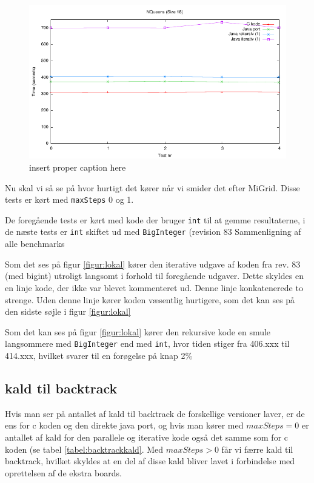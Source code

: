 \begin{figure}[h]
\begin{center}
\includegraphics{../benchmarks/b1.pdf}
\caption{insert proper caption here } 
\label{figur:b1}
\end{center}
\end{figure}

Nu skal vi så se på hvor hurtigt det kører når vi smider det efter MiGrid. 
Disse tests er kørt med \texttt{maxSteps} 0 og 1.

De foregående tests er kørt med kode der bruger \texttt{int} til at gemme resultaterne,
i de næste tests er \texttt{int} skiftet ud med \texttt{BigInteger} (revision
83
\clearpage
Sammenligning af alle benchmarks

Som det ses på figur \ref{figur:lokal} kører den iterative udgave af koden fra
rev. 83 (med bigint) utroligt langsomt i forhold til foregående udgaver.  Dette
skyldes en en linje kode, der ikke var blevet kommenteret ud. Denne linje
konkatenerede to strenge. Uden denne linje kører koden væsentlig hurtigere, som
det kan ses på den sidste søjle i figur \ref{figur:lokal}


Som det kan ses på figur \ref{figur:lokal} kører den rekursive kode en smule
langsommere med \texttt{BigInteger} end med \texttt{int}, hvor tiden stiger fra
406.xxx til 414.xxx, hvilket svarer til en forøgelse
på knap 2\%


\subsection{kald til backtrack}

Hvis man ser på antallet af kald til backtrack de forskellige versioner laver,
er de ens for c koden og den direkte java port, og hvis man kører med
$maxSteps=0$ er antallet af kald for den parallele og iterative kode også det
samme som for c koden (se tabel \ref{tabel:backtrackkald}. Med $maxSteps>0$ får
vi færre kald til backtrack, hvilket skyldes at en del af disse kald bliver
lavet i forbindelse med oprettelsen af de ekstra boards. 

